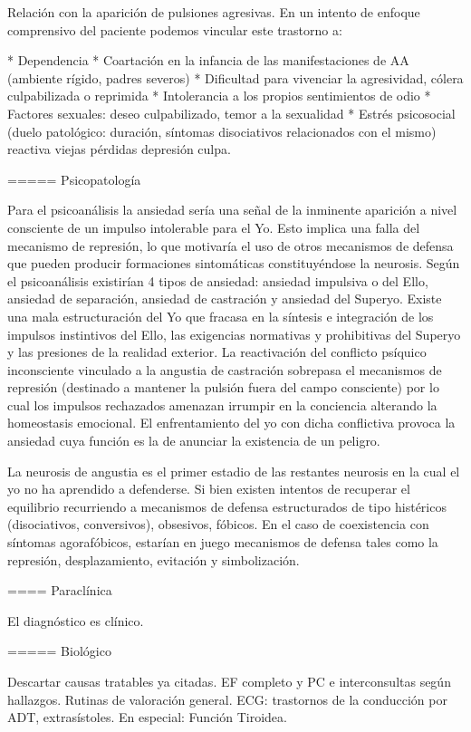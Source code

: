 \documentclass{scrbook}
\begin{document}
Relación con la aparición de pulsiones agresivas. En un intento de enfoque comprensivo del paciente podemos vincular este trastorno a:

* Dependencia
* Coartación en la infancia de las manifestaciones de AA (ambiente rígido, padres severos)
* Dificultad para vivenciar la agresividad, cólera culpabilizada o reprimida
* Intolerancia a los propios sentimientos de odio
* Factores sexuales: deseo culpabilizado, temor a la sexualidad
* Estrés psicosocial (duelo patológico: duración, síntomas disociativos relacionados con el mismo) reactiva viejas pérdidas depresión culpa.

===== Psicopatología

Para el psicoanálisis la ansiedad sería una señal de la inminente aparición a nivel consciente de un impulso intolerable para el Yo. Esto implica una falla del mecanismo de represión, lo que motivaría el uso de otros mecanismos de defensa que pueden producir formaciones sintomáticas constituyéndose la neurosis. Según el psicoanálisis existirían 4 tipos de ansiedad: ansiedad impulsiva o del Ello, ansiedad de separación, ansiedad de castración y ansiedad del Superyo. Existe una mala estructuración del Yo que fracasa en la síntesis e integración de los impulsos instintivos del Ello, las exigencias normativas y prohibitivas del Superyo y las presiones de la realidad exterior. La reactivación del conflicto psíquico inconsciente vinculado a la angustia de castración sobrepasa el mecanismos de represión (destinado a mantener la pulsión fuera del campo consciente) por lo cual los impulsos rechazados amenazan irrumpir en la conciencia alterando la homeostasis emocional. El enfrentamiento del yo con dicha conflictiva provoca la ansiedad cuya función es la de anunciar la existencia de un peligro. 

La neurosis de angustia es el primer estadio de las restantes neurosis en la cual el yo no ha aprendido a defenderse. Si bien existen intentos de recuperar el equilibrio recurriendo a mecanismos de defensa estructurados de tipo histéricos (disociativos, conversivos), obsesivos, fóbicos. En el caso de coexistencia con síntomas agorafóbicos, estarían en juego mecanismos de defensa tales como la represión, desplazamiento, evitación y simbolización.

==== Paraclínica

El diagnóstico es clínico.

===== Biológico

Descartar causas tratables ya citadas. EF completo y PC e interconsultas según hallazgos. Rutinas de valoración general. ECG: trastornos de la conducción por ADT, extrasístoles. En especial: Función Tiroidea.
\end{document}
